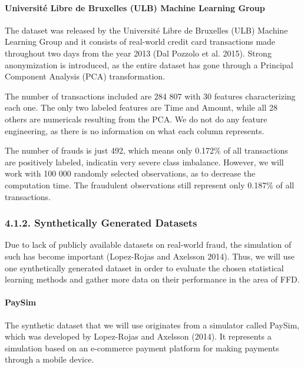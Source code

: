 \documentclass[12pt,]{article}
\let\oldparagraph\paragraph
\renewcommand{\paragraph}[1]{\oldparagraph{#1}\mbox{}}
\begin{document}
\hypertarget{universite-libre-de-bruxelles-ulb-machine-learning-group}{%
\paragraph{Université Libre de Bruxelles (ULB) Machine Learning
Group}\label{universite-libre-de-bruxelles-ulb-machine-learning-group}}

The dataset was released by the Université Libre de Bruxelles (ULB)
Machine Learning Group and it consists of real-world credit card
transactions made throughout two days from the year 2013 (Dal Pozzolo et
al. 2015). Strong anonymization is introduced, as the entire dataset has
gone through a Principal Component Analysis (PCA) transformation.

The number of transactions included are 284 807 with 30 features
characterizing each one. The only two labeled features are Time and
Amount, while all 28 others are numericals resulting from the PCA. We do
not do any feature engineering, as there is no information on what each
column represents.

The number of frauds is just 492, which means only 0.172\% of all
transactions are positively labeled, indicatin very severe class
imbalance. However, we will work with 100 000 randomly selected
observations, as to decrease the computation time. The fraudulent
observations still represent only 0.187\% of all transactions.

\hypertarget{synthetically-generated-datasets}{%
\subsubsection{4.1.2. Synthetically Generated
Datasets}\label{synthetically-generated-datasets}}

Due to lack of publicly available datasets on real-world fraud, the
simulation of such has become important (Lopez-Rojas and Axelsson 2014).
Thus, we will use one synthetically generated dataset in order to
evaluate the chosen statistical learning methods and gather more data on
their performance in the area of FFD.

\hypertarget{paysim}{%
\paragraph{PaySim}\label{paysim}}

The synthetic dataset that we will use originates from a simulator
called PaySim, which was developed by Lopez-Rojas and Axelsson (2014).
It represents a simulation based on an e-commerce payment platform for
making payments through a mobile device.
\end{document}
